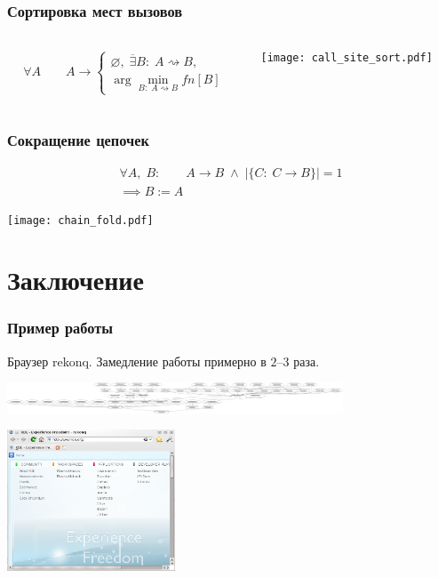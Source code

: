 \documentclass{beamer}
\newcommand{\code}[1]{\textsf{#1}}
\begin{document}
\begin{frame}
\frametitle{Сортировка мест вызовов}
\begin{columns}
\begin{column}[T]{0.45\textwidth}
\begin{eqnarray*}
\forall A\qquad A \rightarrow \begin{cases}
\varnothing,\; \overline{\exists} B:\; A \rightsquigarrow B,\\
\arg\min\limits_{B:\; A \rightsquigarrow B}fn[B]
\end{cases}
\end{eqnarray*}
\end{column}
\begin{column}[T]{0.45\textwidth}
\begin{center}
    \texttt{[image: call\_site\_sort.pdf]}
\end{center}
\end{column}
\end{columns}
\end{frame}

\begin{frame}
\frametitle{Сокращение цепочек}
\begin{eqnarray*}
\forall A,\;B:\qquad A \rightarrow B\;\wedge\;|\{C:\; C \rightarrow B\}| = 1\\
\implies B := A
\end{eqnarray*}
\begin{center}
    \texttt{[image: chain\_fold.pdf]}
\end{center}
\end{frame}

\section{Заключение}

\begin{frame}
\frametitle{Пример работы}
Браузер \code{rekonq}. Замедление работы примерно в $2$--$3$ раза.
\vspace{0.5cm}
\begin{center}
\includegraphics[width=10cm]{rekonq-hier.png}
\end{center}
\vspace{0.5cm}
\begin{center}
\includegraphics[width=5cm]{rekonq.png}
\end{center}
\end{frame}
\end{document}
